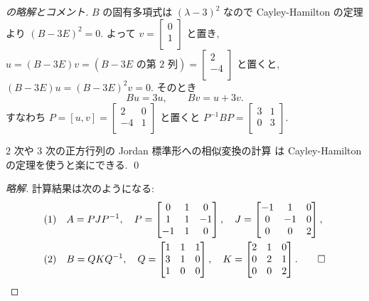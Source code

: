 \documentclass[12pt,twoside]{jarticle}
\begin{document}
\begin{proof}[\protect{[42]}の略解とコメント]
$B$ の固有多項式は $(\lambda-3)^2$ なので 
Cayley-Hamilton の定理より $(B-3E)^2=0$.  
よって $v=
\begin{bmatrix}
  0 \\
  1 \\
\end{bmatrix}$ と置き, $u = (B-3E)v = (\text{$B-3E$ の第 $2$ 列}) = 
\begin{bmatrix}
  2 \\
  -4 \\
\end{bmatrix}$ と置くと, $(B-3E)u=(B-3E)^2v=0$. そのとき
\begin{equation*}
  Bu = 3u, \qquad Bv = u + 3v.
\end{equation*}
すなわち $P = [u,v] = 
\begin{bmatrix}
   2 & 0 \\
  -4 & 1 \\
\end{bmatrix}$ と置くと $P^{-1}BP=
\begin{bmatrix}
  3 & 1 \\
  0 & 3 \\
\end{bmatrix}$.

\medskip{} 
$2$ 次や $3$ 次の正方行列の Jordan 標準形への相似変換の計算
は Cayley-Hamilton の定理を使うと楽にできる.
\qed
\end{proof}

\begin{proof}[\protect{[56]}略解]
計算結果は次のようになる:
\begin{align*}
  &
  \text{(1)} \quad
  A = PJP^{-1},
  \quad
  P =
  \begin{bmatrix}
     0 &  1 &  0 \\
     1 &  1 & -1 \\
    -1 &  1 &  0 \\
  \end{bmatrix},
  \quad
  J = 
  \begin{bmatrix}
    -1 &  1 &  0 \\
     0 & -1 &  0 \\
     0 &  0 &  2 \\
  \end{bmatrix},
  \\ &
  \text{(2)} \quad
  B = QKQ^{-1},
  \quad
  Q =
  \begin{bmatrix}
    1 & 1 & 1 \\
    3 & 1 & 0 \\
    1 & 0 & 0 \\
  \end{bmatrix},
  \quad
  K = 
  \begin{bmatrix}
    2 & 1 & 0 \\
    0 & 2 & 1 \\
    0 & 0 & 2 \\
  \end{bmatrix}.
  \qed
\end{align*}
\end{proof}
\end{document}
